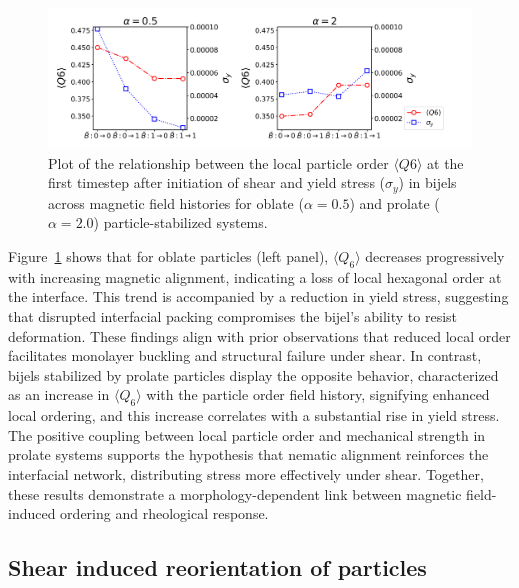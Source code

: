 \begin{figure} 
    \centering 
    \includegraphics[scale=0.4]{../figures/results/paper3/Q6-start.png} 
    \caption{Plot of the relationship between the local particle order $\langle Q6 \rangle$ at the first timestep after initiation of shear and 
             yield stress ($\sigma_y$) in bijels across magnetic field histories for oblate 
             ($\alpha = 0.5$) and prolate ($\alpha = 2.0$) particle-stabilized systems.} 
    \label{fig:q6_rheology_init} 
\end{figure}

Figure~\ref{fig:q6_rheology_init} shows that for oblate particles (left panel), $\langle Q_6 \rangle$ decreases progressively with increasing magnetic alignment, 
indicating a loss of local hexagonal
order at the interface. This trend is accompanied by a reduction in yield stress, suggesting that disrupted interfacial packing compromises the bijel's 
ability to resist deformation. These findings align with prior observations that reduced local order facilitates monolayer buckling and structural failure 
under shear. In contrast, bijels stabilized by prolate particles display the opposite behavior, characterized as an increase in $\langle Q_6 \rangle$ with
the particle order field history, signifying enhanced local ordering, and this increase correlates with a substantial rise in yield stress. The positive 
coupling between local particle order and mechanical strength in prolate systems supports the hypothesis that nematic alignment reinforces the interfacial 
network, distributing stress more effectively under shear. Together, these results demonstrate a morphology-dependent link between magnetic field-induced 
ordering and rheological response. 

\subsection{Shear induced reorientation of particles}

